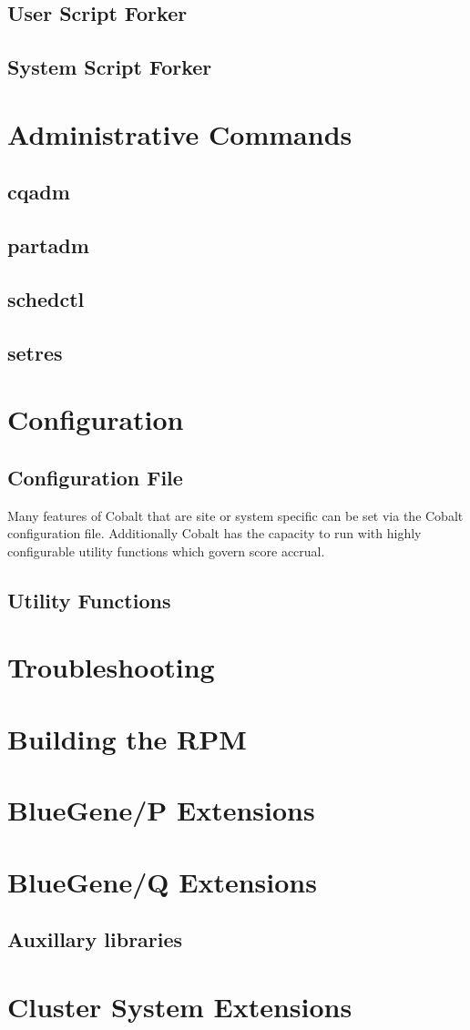 \documentclass[10pt,letterpaper]{book}
\begin{document}
\section{User Script Forker}
\section{System Script Forker}

\chapter{Administrative Commands}
\section{cqadm}
\section{partadm}
\section{schedctl}
\section{setres}

\chapter{Configuration}
\section{Configuration File}
Many features of Cobalt that are site or system specific can be set via the Cobalt configuration file.  Additionally Cobalt has the capacity to run with highly configurable utility functions which govern score accrual.
\section{Utility Functions}

  
\chapter{Troubleshooting}

\appendix
\chapter {Building the RPM}
\chapter{BlueGene/P Extensions}
\chapter{BlueGene/Q Extensions}
\section{Auxillary libraries}
\chapter{Cluster System Extensions}
\end{document}
